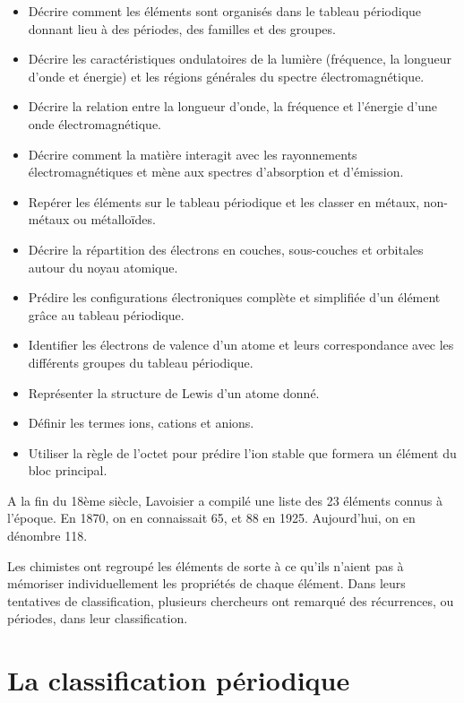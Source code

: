 \documentclass[
  11pt,
  a4paper,
  openany]{book}
\providecommand{\tightlist}{%
  \setlength{\itemsep}{0pt}\setlength{\parskip}{0pt}}
\begin{document}
\begin{objectives}

\begin{itemize}
\tightlist
\item
  Décrire comment les éléments sont organisés dans le tableau périodique donnant lieu à des périodes, des familles et des groupes.
\item
  Décrire les caractéristiques ondulatoires de la lumière (fréquence, la longueur d'onde et énergie) et les régions générales du spectre électromagnétique.
\item
  Décrire la relation entre la longueur d'onde, la fréquence et l'énergie d'une onde électromagnétique.
\item
  Décrire comment la matière interagit avec les rayonnements électromagnétiques et mène aux spectres d'absorption et d'émission.
\item
  Repérer les éléments sur le tableau périodique et les classer en métaux, non-métaux ou métalloïdes.
\item
  Décrire la répartition des électrons en couches, sous-couches et orbitales autour du noyau atomique.
\item
  Prédire les configurations électroniques complète et simplifiée d'un élément grâce au tableau périodique.
\item
  Identifier les électrons de valence d'un atome et leurs correspondance avec les différents groupes du tableau périodique.
\item
  Représenter la structure de Lewis d'un atome donné.
\item
  Définir les termes ions, cations et anions.
\item
  Utiliser la règle de l'octet pour prédire l'ion stable que formera un élément du bloc principal.
\end{itemize}

\end{objectives}

A la fin du 18ème siècle, Lavoisier a compilé une liste des 23 éléments connus à l'époque. En 1870, on en connaissait 65, et 88 en 1925. Aujourd'hui, on en dénombre 118.

Les chimistes ont regroupé les éléments de sorte à ce qu'ils n'aient pas à mémoriser individuellement les propriétés de chaque élément. Dans leurs tentatives de classification, plusieurs chercheurs ont remarqué des récurrences, ou périodes, dans leur classification.

\section{La classification périodique}\label{la-classification-puxe9riodique}
\end{document}
